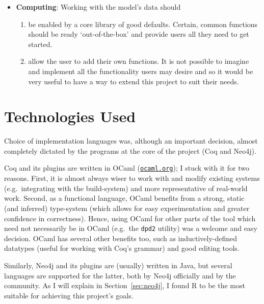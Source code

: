 \begin{itemize}
\begin{enumerate}[label=\textbf{I\arabic*},ref={I\arabic*}]
  \end{enumerate}

  \item \textbf {Computing}: Working with the model's data should
  \begin{enumerate}[label=\textbf{C\arabic*},ref={C\arabic*}]

    \item\label{req:c1} be enabled by a core library of good defaults. Certain,
      common functions should be ready `out-of-the-box' and provide users all
      they need to get started.

    \item\label{req:c2} allow the user to add their own functions. It is not
      possible to imagine and implement all the functionality users may desire
      and so it would be very useful to have a way to extend this project to suit
      their needs.

  \end{enumerate}


\end{itemize}

\section{Technologies Used}

Choice of implementation languages was, although an important decision, almost
completely dictated by the programs at the core of the project (Coq and Neo4j).

Coq and its plugins are written in OCaml
(\href{http://ocaml.org}{\texttt{ocaml.org}}); I stuck with it for two reasons.
First, it is almost always wiser to work with and modify existing systems (e.g.\
integrating with the build-system) and more representative of real-world work.
Second, as a functional language, OCaml benefits from a strong, static (and
inferred) type-system (which allows for easy experimentation and greater
confidence in correctness). Hence, using OCaml for other parts of the tool which
need not necessarily be in OCaml (e.g.\ the \texttt{dpd2} utility) was a welcome
and easy decision. OCaml has several other benefits too, such as
inductively-defined datatypes (useful for working with Coq's grammar) and good
editing tools.

Similarly, Neo4j and its plugins are (usually) written in Java, but several
languages are supported for the latter, both by Neo4j officially and by the
community. As I will explain in Section~\ref{sec:neo4j}, I found R to be the
most suitable for achieving this project's goals.

